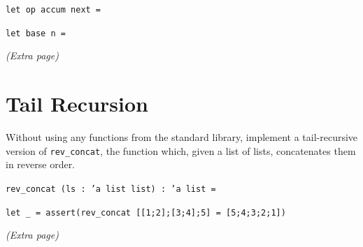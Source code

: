 \documentclass{article}
\theoremstyle{remark} \newtheorem*{solution}{Solution}
\begin{document}
\noindent\texttt{let op accum next =}
\vspace{4in}

\noindent\texttt{let base n =}


\pagebreak
\textit{(Extra page)}

\pagebreak
\section{Tail Recursion}

Without using any functions from the standard library, implement a tail-recursive version of \texttt{rev\_concat}, the function which, given a list of lists, concatenates them in reverse order.
\bigskip

\noindent\texttt{rev\_concat (ls : 'a list list) : 'a list =}

\vfill

\noindent\texttt{let \_ = assert(rev\_concat [[1;2];[3;4];5] = [5;4;3;2;1])}


\pagebreak
\textit{(Extra page)}
\end{document}
